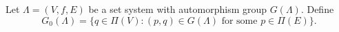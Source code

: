 Let $\Lambda = (V, f, E)$ be a set system with automorphism group $G(\Lambda)$. Define
$$G_0(\Lambda) = \{q \in \Pi(V) : (p, q) \in G(\Lambda) \text{ for some } p \in \Pi(E)\}.$$

